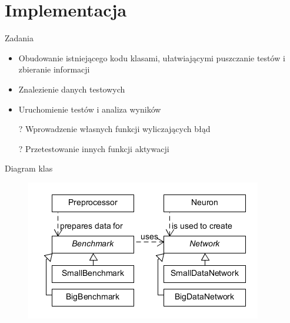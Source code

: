 \documentclass{beamer}
\begin{document}
\section{Implementacja}
\begin{frame}{Zadania}
\begin{itemize}
\item Obudowanie istniejącego kodu klasami, ułatwiającymi puszczanie testów i zbieranie informacji
\item Znalezienie danych testowych
\item Uruchomienie testów i analiza wyników
\item[?] Wprowadzenie własnych funkcji wyliczających błąd 
\item[?] Przetestowanie innych funkcji aktywacji
\end{itemize}
\end{frame}

\begin{frame}{Diagram klas}
\begin{figure}
	\includegraphics[width=\textwidth]{classescompact.png}
\end{figure}
\end{frame}
\end{document}
